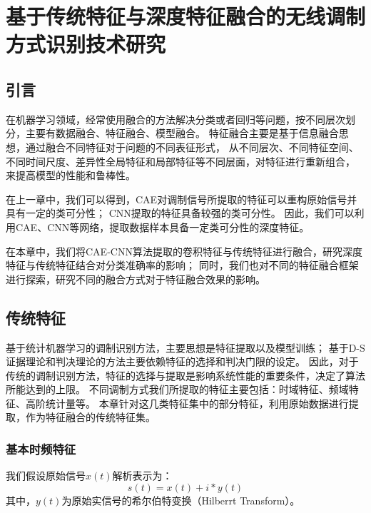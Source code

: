 \chapter{基于传统特征与深度特征融合的无线调制方式识别技术研究}
\section{引言}
在机器学习领域，经常使用融合的方法解决分类或者回归等问题，按不同层次划分，主要有数据融合、特征融合、模型融合。
特征融合主要是基于信息融合思想，通过融合不同特征对于问题的不同表征形式，
从不同层次、不同特征空间、不同时间尺度、差异性全局特征和局部特征等不同层面，对特征进行重新组合，
来提高模型的性能和鲁棒性\cite{刘渭滨2017模式分类中的特征融合方法}\cite{于政委2017基于多特征融合的调制模式识别研究}。\par

在上一章中，我们可以得到，CAE对调制信号所提取的特征可以重构原始信号并具有一定的类可分性；
CNN提取的特征具备较强的类可分性。
因此，我们可以利用CAE、CNN等网络，提取数据样本具备一定类可分性的深度特征。\par

在本章中，我们将CAE-CNN算法提取的卷积特征与传统特征进行融合，研究深度特征与传统特征结合对分类准确率的影响；
同时，我们也对不同的特征融合框架进行探索，研究不同的融合方式对于特征融合效果的影响。\par

\section{传统特征}
基于统计机器学习的调制识别方法，主要思想是特征提取以及模型训练；
基于D-S证据理论和判决理论的方法主要依赖特征的选择和判决门限的设定。
因此，对于传统的调制识别方法，特征的选择与提取是影响系统性能的重要条件，决定了算法所能达到的上限。
不同调制方式我们所提取的特征主要包括：时域特征、频域特征、高阶统计量等。
本章针对这几类特征集中的部分特征，利用原始数据进行提取，作为特征融合的传统特征集。\par

\subsection{基本时频特征}

我们假设原始信号$x(t)$解析表示为：
\begin{equation}
\label{eqt_4_1}
s(t)=x(t)+i*y(t)
\end{equation}
其中，$y(t)$为原始实信号的希尔伯特变换（Hilberrt Transform）。\par

